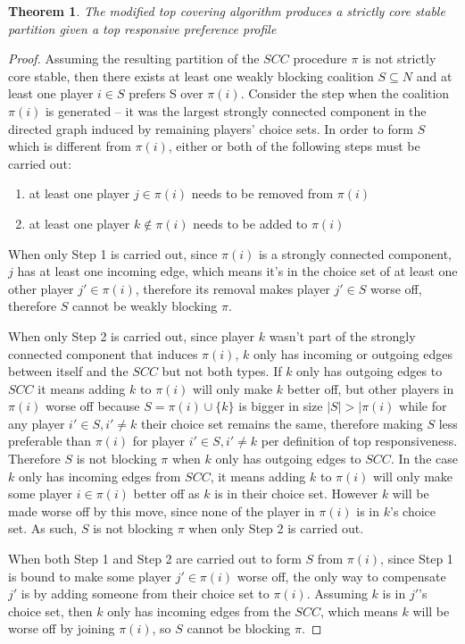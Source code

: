 \documentclass[letterpaper]{article} %
\newtheorem{theorem}{Theorem}
\begin{document}
\begin{theorem}
  The modified top covering algorithm produces a strictly core stable partition given a top responsive preference profile
\end{theorem}

\begin{proof}
Assuming the resulting partition of the $SCC$ procedure $\pi$ is not strictly core stable, then there exists at least one weakly blocking coalition $S \subseteq N$ and at least one player $i \in S$ prefers S over $\pi(i)$. Consider the step when the coalition $\pi(i)$ is generated – it was the largest strongly connected component in the directed graph induced by remaining players' choice sets. In order to form $S$ which is different from $\pi(i)$, either or both of the following steps must be carried out:

\begin{enumerate}
  \item at least one player $j \in \pi(i)$ needs to be removed from $\pi(i)$
  \item at least one player $k \notin \pi(i)$ needs to be added to $\pi(i)$
\end{enumerate}

When only Step 1 is carried out, since $\pi(i)$ is a strongly connected component, $j$ has at least one incoming edge, which means it's in the choice set of at least one other player $j' \in \pi(i)$, therefore its removal makes player $j' \in S$ worse off, therefore $S$ cannot be weakly blocking $\pi$.

When only Step 2 is carried out, since player $k$ wasn't part of the strongly connected component that induces $\pi(i)$, $k$ only has incoming or outgoing edges between itself and the $SCC$ but not both types. If $k$ only has outgoing edges to $SCC$ it means adding $k$ to $\pi(i)$ will only make $k$ better off, but other players in $\pi(i)$ worse off because $S = \pi(i) \cup \{k\}$ is bigger in size $|S| > |\pi(i)$ while for any player $i' \in S, i' \neq k$ their choice set remains the same, therefore making $S$ less preferable than $\pi(i)$ for player $i' \in S, i' \neq k$ per definition of top responsiveness. Therefore $S$ is not blocking $\pi$ when $k$ only has outgoing edges to $SCC$. In the case $k$ only has incoming edges from $SCC$, it means adding $k$ to $\pi(i)$ will only make some player $i \in \pi(i)$ better off as $k$ is in their choice set. However $k$ will be made worse off by this move, since none of the player in $\pi(i)$ is in $k$'s choice set. As such, $S$ is not blocking $\pi$ when only Step 2 is carried out.

When both Step 1 and Step 2 are carried out to form $S$ from $\pi(i)$, since Step 1 is bound to make some player $j' \in \pi(i)$ worse off, the only way to compensate $j'$ is by adding someone from their choice set to $\pi(i)$. Assuming $k$ is in $j'$'s choice set, then $k$ only has incoming edges from the $SCC$, which means $k$ will be worse off by joining $\pi(i)$, so $S$ cannot be blocking $\pi$.
\end{proof}
\end{document}
